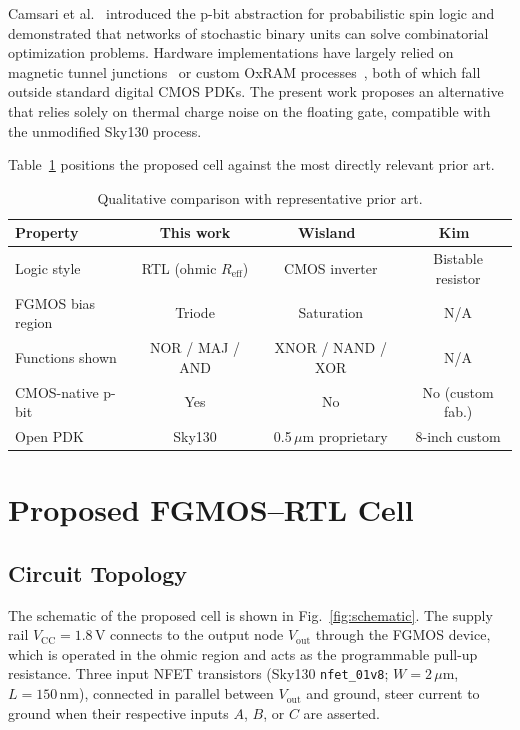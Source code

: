 \documentclass[a4paper,fleqn]{cas-sc}
\newcommand{\Vout}{V_{\mathrm{out}}}
\newcommand{\Vcc}{V_{\mathrm{CC}}}
\newcommand{\Reff}{R_{\mathrm{eff}}}
\begin{document}
Camsari et al.~\cite{Camsari2019} introduced the p-bit abstraction for probabilistic
spin logic and demonstrated that networks of stochastic binary units can solve
combinatorial optimization problems. Hardware implementations have largely relied on
magnetic tunnel junctions~\cite{Camsari2019} or custom OxRAM processes~\cite{Kim2024},
both of which fall outside standard digital CMOS PDKs. The present work proposes an
alternative that relies solely on thermal charge noise on the floating gate, compatible
with the unmodified Sky130 process.

Table~\ref{tbl:prior} positions the proposed cell against the most directly relevant
prior art.

\begin{table}[htb]
\centering
\caption{Qualitative comparison with representative prior art.}
\label{tbl:prior}
\begin{tabular}{@{}lccc@{}}
\toprule
Property           & This work        & Wisland~\cite{Wisland2003} & Kim~\cite{Kim2024} \\
\midrule
Logic style        & RTL (ohmic $\Reff$) & CMOS inverter           & Bistable resistor \\
FGMOS bias region  & Triode           & Saturation                & N/A               \\
Functions shown    & NOR / MAJ / AND  & XNOR / NAND / XOR         & N/A               \\
CMOS-native p-bit  & Yes              & No                        & No (custom fab.)  \\
Open PDK           & Sky130           & 0.5\,$\mu$m proprietary   & 8-inch custom     \\
\bottomrule
\end{tabular}
\end{table}

\section{Proposed FGMOS--RTL Cell}
\label{sec:cell}

\subsection{Circuit Topology}

The schematic of the proposed cell is shown in Fig.~\ref{fig:schematic}. The supply
rail $\Vcc = 1.8$\,V connects to the output node $\Vout$ through the FGMOS device,
which is operated in the ohmic region and acts as the programmable pull-up resistance.
Three input NFET transistors (Sky130 \texttt{nfet\_01v8}; $W = 2\,\mu$m,
$L = 150$\,nm), connected in parallel between $\Vout$ and ground, steer current to
ground when their respective inputs $A$, $B$, or $C$ are asserted.
\end{document}
